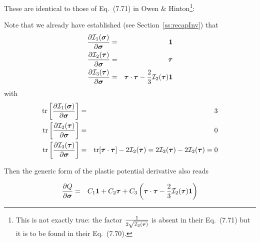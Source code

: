 These are identical to those of Eq.~(7.71) in Owen \& Hinton\footnote{This is 
not exactly true: the factor  $\frac{1}{2 \sqrt{ {\cal I}_2(\bm\tau)} }$
is absent in their Eq.~(7.71) but it is to be found in their Eq.~(7.70).}:
\begin{center}
\end{center}

\noindent Note that we already have established (see Section~\ref{ss:recapInv}) that  
\begin{eqnarray}
\frac{\partial {\cal I}_1(\bm\sigma)}{\partial \bm\sigma} &=& {\bm 1} \\
\frac{\partial {\cal I}_2(\bm\tau)}{\partial \bm\sigma} &=& {\bm \tau} \\
\frac{\partial {\cal I}_3(\bm\tau)}{\partial \bm\sigma} 
&=& \bm\tau\cdot\bm\tau - \frac23  {\cal I}_2(\bm\tau)  {\bm 1}
\end{eqnarray}
with
\begin{eqnarray}
{\rm tr}\left[ \frac{\partial {\cal I}_1(\bm\sigma)}{\partial \bm\sigma} \right] &=& 3 \\  
{\rm tr}\left[ \frac{\partial {\cal I}_2(\bm\tau)}{\partial \bm\sigma}   \right] &=& 0 \\
{\rm tr}\left[ \frac{\partial {\cal I}_3(\bm\tau)}{\partial \bm\sigma}   \right] &=& {\rm tr}[\bm\tau\cdot\bm\tau] - 2  {\cal I}_2(\bm\tau) = 2  {\cal I}_2(\bm\tau) -2  {\cal I}_2(\bm\tau) = 0 
\end{eqnarray}

Then the generic form of the plastic potential derivative also reads
\begin{mdframed}[backgroundcolor=blue!5]
\begin{eqnarray}
\frac{\partial Q}{\partial \bm\sigma}
&=&
C_1 {\bm 1} 
+
C_2 {\bm \tau} 
+
C_3  \left( \bm\tau\cdot\bm\tau - \frac23  {\cal I}_2(\bm\tau)  {\bm 1} \right)
\end{eqnarray}
\end{mdframed}

